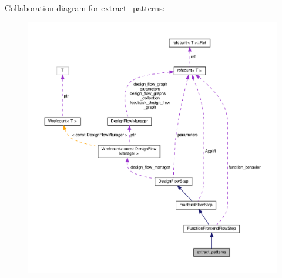 Collaboration diagram for extract\+\_\+patterns\+:
\nopagebreak
\begin{figure}[H]
\begin{center}
\leavevmode
\includegraphics[width=350pt]{d4/d8f/classextract__patterns__coll__graph}
\end{center}
\end{figure}
